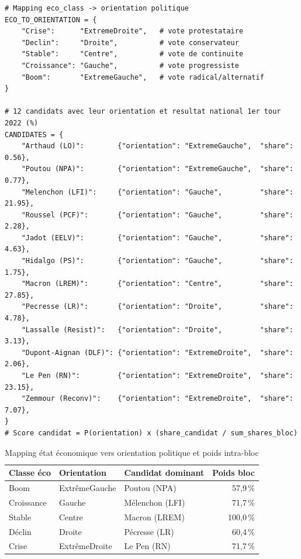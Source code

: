 \documentclass[12pt,a4paper,oneside]{report}
\newcommand{\pct}[1]{#1\,\%}
\begin{document}
\begin{lstlisting}[caption={Mapping économique vers orientation politique — ML notebook}]
# Mapping eco_class -> orientation politique
ECO_TO_ORIENTATION = {
    "Crise":      "ExtremeDroite",   # vote protestataire
    "Declin":     "Droite",          # vote conservateur
    "Stable":     "Centre",          # vote de continuite
    "Croissance": "Gauche",          # vote progressiste
    "Boom":       "ExtremeGauche",   # vote radical/alternatif
}

# 12 candidats avec leur orientation et resultat national 1er tour 2022 (%)
CANDIDATES = {
    "Arthaud (LO)":        {"orientation": "ExtremeGauche",  "share": 0.56},
    "Poutou (NPA)":        {"orientation": "ExtremeGauche",  "share": 0.77},
    "Melenchon (LFI)":     {"orientation": "Gauche",         "share": 21.95},
    "Roussel (PCF)":       {"orientation": "Gauche",         "share": 2.28},
    "Jadot (EELV)":        {"orientation": "Gauche",         "share": 4.63},
    "Hidalgo (PS)":        {"orientation": "Gauche",         "share": 1.75},
    "Macron (LREM)":       {"orientation": "Centre",         "share": 27.85},
    "Pecresse (LR)":       {"orientation": "Droite",         "share": 4.78},
    "Lassalle (Resist)":   {"orientation": "Droite",         "share": 3.13},
    "Dupont-Aignan (DLF)": {"orientation": "ExtremeDroite",  "share": 2.06},
    "Le Pen (RN)":         {"orientation": "ExtremeDroite",  "share": 23.15},
    "Zemmour (Reconv)":    {"orientation": "ExtremeDroite",  "share": 7.07},
}
# Score candidat = P(orientation) x (share_candidat / sum_shares_bloc)
\end{lstlisting}

\begin{table}[H]
  \centering
  \caption{Mapping état économique vers orientation politique et poids intra-bloc}
  \label{tab:mapping_eco}
  \begin{tabular}{lllr}
    \toprule
    \textbf{Classe éco} & \textbf{Orientation} & \textbf{Candidat dominant} & \textbf{Poids bloc} \\
    \midrule
    Boom        & ExtrêmeGauche & Poutou (NPA)         & \pct{57,9} \\
    Croissance  & Gauche        & Mélenchon (LFI)      & \pct{71,7} \\
    Stable      & Centre        & Macron (LREM)        & \pct{100,0} \\
    Déclin      & Droite        & Pécresse (LR)        & \pct{60,4} \\
    Crise       & ExtrêmeDroite & Le Pen (RN)          & \pct{71,7} \\
    \bottomrule
  \end{tabular}
\end{table}
\end{document}
